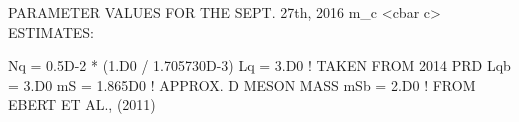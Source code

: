PARAMETER VALUES FOR THE SEPT. 27th, 2016 m_c <cbar c> ESTIMATES:

       Nq = 0.5D-2 * (1.D0 / 1.705730D-3)
       Lq = 3.D0     ! TAKEN FROM 2014 PRD
       Lqb = 3.D0
       mS = 1.865D0  ! APPROX. D MESON MASS
       mSb = 2.D0    ! FROM EBERT ET AL., (2011)

